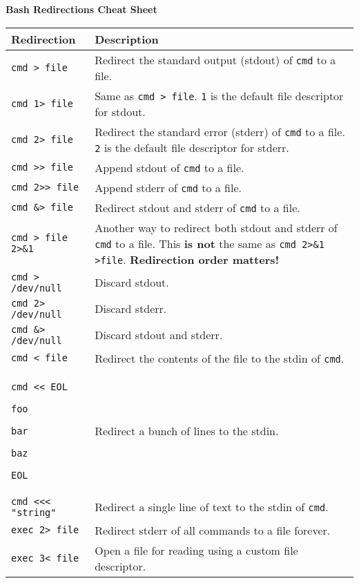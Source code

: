 \documentclass{article}
\begin{document}
\begin{center}
\Large \textbf{Bash Redirections Cheat Sheet}
\end{center}

\vspace{0.4in}

\renewcommand{\arraystretch}{1.2}
\begin{tabular}{|m{5.5cm}|m{12.2cm}|}
\hline
\large\textbf{Redirection} & \large\textbf{Description} \\
\hline
\verb|cmd > file| & Redirect the standard output (stdout) of \verb|cmd| to a file. \\
\hline
\verb|cmd 1> file| & Same as \verb|cmd > file|. \verb|1| is the default file descriptor for stdout. \\
\hline
\verb|cmd 2> file| & Redirect the standard error (stderr) of \verb|cmd| to a file. \verb|2| is the default file descriptor for stderr. \\
\hline
\verb|cmd >> file| & Append stdout of \verb|cmd| to a file. \\
\hline
\verb|cmd 2>> file| & Append stderr of \verb|cmd| to a file. \\
\hline
\verb|cmd &> file| & Redirect stdout and stderr of \verb|cmd| to a file. \\
\hline
\verb|cmd > file 2>&1| & Another way to redirect both stdout and stderr of \verb|cmd| to a file. This \textbf{is not} the same as \verb|cmd 2>&1 >file|. \textbf{Redirection order matters!} \\
\hline
\verb|cmd > /dev/null| & Discard stdout. \\
\hline
\verb|cmd 2> /dev/null| & Discard stderr. \\
\hline
\verb|cmd &> /dev/null| & Discard stdout and stderr. \\
\hline
\verb|cmd < file| & Redirect the contents of the file to the stdin of \verb|cmd|. \\
\hline
\verb|cmd << EOL| \par
\verb|foo| \par
\verb|bar| \par
\verb|baz| \par
\verb|EOL| & Redirect a bunch of lines to the stdin. \\
\hline
\verb|cmd <<< "string"| & Redirect a single line of text to the stdin of \verb|cmd|. \\
\hline
\verb|exec 2> file| & Redirect stderr of all commands to a file forever. \\
\hline
\verb|exec 3< file| & Open a file for reading using a custom file descriptor. \\

\end{tabular}
\end{document}
